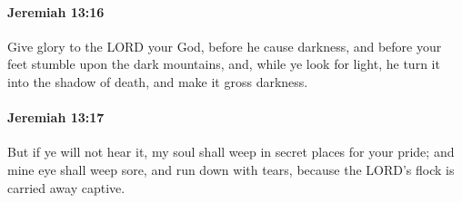 		\paragraph{Jeremiah 13:16} %
			\label{JEREMIAH-13-16}

			Give glory to the LORD your God, before he cause darkness, and before your feet stumble upon the dark mountains, and, while ye look for light, he turn it into the shadow of death, and make it gross darkness.


		\paragraph{Jeremiah 13:17} %
			\label{JEREMIAH-13-17}

			But if ye will not hear it, my soul shall weep in secret places for your pride; and mine eye shall weep sore, and run down with tears, because the LORD’s flock is carried away captive.

